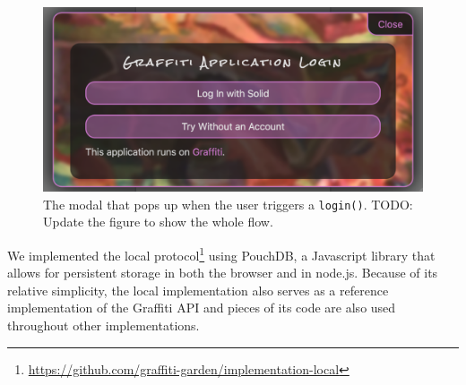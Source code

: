 \begin{figure}
    \label{above-and-below:login}
    \includegraphics[width=\columnwidth]{figures/login.png}
    \caption{The modal that pops up when the user triggers a \texttt{login()}. TODO: Update the figure to show the whole flow.}
\end{figure}

We implemented the local protocol\footnote{
    \url{https://github.com/graffiti-garden/implementation-local}
} using PouchDB, a Javascript library that allows for persistent
storage in both the browser and in node.js.
Because of its relative simplicity, the local implementation also serves
as a reference implementation of the Graffiti API and pieces of its code are also used
throughout other implementations.





